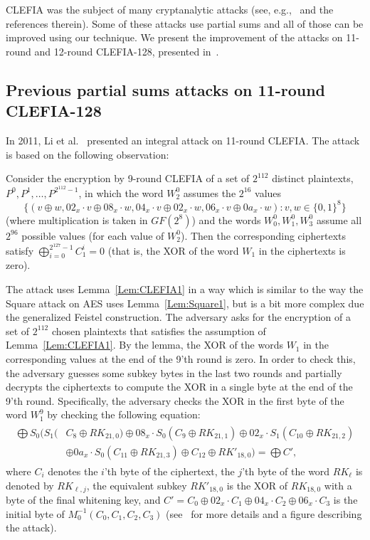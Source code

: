 CLEFIA was the subject of many cryptanalytic attacks (see, e.g.,~\cite{SAC:BGWWC13,FSE:LiJWD15} and the references therein). Some of these attacks use partial sums and all of those can be improved using our technique. We present the improvement of the attacks on 11-round and 12-round CLEFIA-128, presented in~\cite{SAC:SasWan12}.

\subsection{Previous partial sums attacks on 11-round CLEFIA-128}

In 2011, Li et al.~\cite{WISA:LiWuZha11} presented an integral attack on 11-round CLEFIA. The attack is based on the following observation: 
\begin{lemma}\label{Lem:CLEFIA1}
Consider the encryption by 9-round CLEFIA of a set of $2^{112}$ distinct plaintexts, $P^0,P^1,\ldots,P^{2^{112}-1}$, in which the word $W^0_2$ assumes the $2^{16}$ values 
$$
\{(v\oplus w, 02_x\cdot v \oplus 08_x \cdot w, 04_x\cdot v \oplus 02_x \cdot w, 06_x\cdot v \oplus 0a_x \cdot w): v,w \in \{0,1\}^8\}
$$
(where multiplication is taken in $GF(2^8)$) and the words $W^0_0,W^0_1,W^0_3$ assume all $2^{96}$ possible values (for each value of $W^0_2$). Then the corresponding ciphertexts satisfy $\bigoplus_{i=0}^{2^{127}-1} C^i_1=0$ (that is, the XOR of the word $W_1$ in the ciphertexts is zero).  
\end{lemma}
The attack uses Lemma~\ref{Lem:CLEFIA1} in a way which is similar to the way the Square attack on AES uses Lemma~\ref{Lem:Square1}, but is a bit more complex due the generalized Feistel construction. The adversary asks for the encryption of a set of $2^{112}$ chosen plaintexts that satisfies the assumption of Lemma~\ref{Lem:CLEFIA1}.
By the lemma, the XOR of the words $W_1$ in the corresponding values at the end of the 9'th round is zero. In order to check this, the adversary guesses some subkey bytes in the last two rounds and partially decrypts the ciphertexts to compute the XOR in a single byte at the end of the 9'th round. Specifically, the adversary checks the XOR in the first byte of the word $W^{9}_1$ by checking the following equation:
\begin{align}\label{Eq:CLEFIA1}
  \begin{split}
\bigoplus S_0(S_1(&C_8 \oplus RK_{21,0}) \oplus 08_x \cdot S_0(C_9 \oplus RK_{21,1}) \oplus 02_x \cdot S_1(C_{10} \oplus RK_{21,2}) \\ &\oplus 0a_x \cdot S_0(C_{11} \oplus RK_{21,3}) \oplus C_{12} \oplus RK'_{18,0})=\bigoplus C',
  \end{split}  
\end{align}
where $C_i$ denotes the $i$'th byte of the ciphertext, the $j$'th byte of the word $RK_{\ell}$ is denoted by $RK_{\ell,j}$, the equivalent subkey $RK'_{18,0}$ is the XOR of $RK_{18,0}$ with a byte of the final whitening key, and $C'=C_0 \oplus 02_x \cdot C_1 \oplus 04_x \cdot C_2 \oplus 06_x \cdot C_3$ is the initial byte of $M_0^{-1}(C_0,C_1,C_2,C_3)$ (see~\cite{SAC:SasWan12} for more details and a figure describing the attack).

